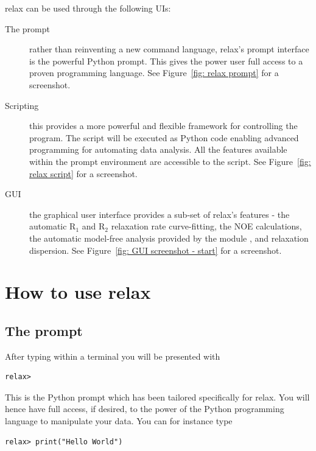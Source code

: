 relax can be used through the following UIs:
\begin{description}
  \item[The prompt] rather than reinventing a new command language, relax's prompt interface is the powerful Python prompt.
    This gives the power user full access to a proven programming language.
    See Figure~\ref{fig: relax prompt} for a screenshot.
  \item[Scripting] this provides a more powerful and flexible framework for controlling the program.
    The script will be executed as Python code enabling advanced programming for automating data analysis.
    All the features available within the prompt environment are accessible to the script.
    See Figure~\ref{fig: relax script} for a screenshot.
  \item[GUI] the graphical user interface provides a sub-set of relax's features - the automatic R$_1$ and R$_2$ relaxation rate curve-fitting, the NOE calculations, the automatic model-free analysis provided by the  module \citep{dAuvergneGooley08b}, and relaxation dispersion.
    See Figure~\ref{fig: GUI screenshot - start} for a screenshot.
\end{description}




\section{How to use relax}



\subsection{The prompt}

After typing  within a terminal you will be presented with

\begin{lstlisting}[numbers=none]
relax>
\end{lstlisting}

This is the Python prompt which has been tailored specifically for relax.
You will hence have full access, if desired, to the power of the Python programming language to manipulate your data.
You can for instance type

\begin{lstlisting}[numbers=none]
relax> print("Hello World")
\end{lstlisting}

